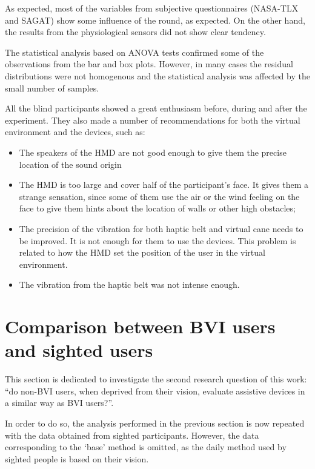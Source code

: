 As expected, most of the variables from subjective questionnaires (NASA-TLX and SAGAT) show some influence of the round, as expected. On the other hand, the results from the physiological sensors did not show clear tendency. 

The statistical analysis based on ANOVA tests confirmed some of the observations from the bar and box plots. However, in many cases the residual distributions were not homogenous and the statistical analysis was affected by the small number of samples. 

All the blind participants showed a great enthusiasm before, during and after the experiment. They also made a number of recommendations for both the virtual environment and the devices, such as:

\begin{itemize}
    \item The speakers of the HMD are not good enough to give them the precise location of the sound origin
    \item The HMD is too large and cover half of the participant’s face. It gives them a strange sensation, since some of them use the air or the wind feeling on the face to give them hints about the location of walls or other high obstacles;
    \item The precision of the vibration for both haptic belt and virtual cane needs to be improved. It is not enough for them to use the devices. This problem is related to how the HMD set the position of the user in the virtual environment. \\    
    \item The vibration from the haptic belt was not intense enough.
\end{itemize}

\section{Comparison between BVI users and sighted users}
\label{sec:results_obj_2}

This section is dedicated to investigate the second research question of this work: “do non-BVI users, when deprived from their vision, evaluate assistive devices in a similar way as BVI users?”. 

In order to do so, the analysis performed in the previous section is now repeated with the data obtained from sighted participants. However, the data corresponding to the ‘base’ method is omitted, as the daily method used by sighted people is based on their vision.

